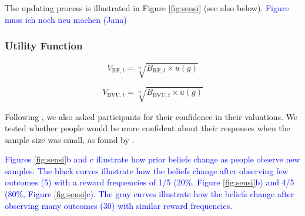 \documentclass[a4paper, man, natbib, floatsintext]{apa6} %
\begin{document}
The updating process is illustrated in Figure \ref{fig:sensi} (see also below). \textcolor{blue}{Figure muss ich noch neu machen (Jana)}

\subsubsection{Utility Function}

$$V_{\mathrm{RF}, t} = \sqrt[\mathrm{\alpha}]{{B}_{\mathrm{RF}, t} \times u({g})}$$

$$V_{\mathrm{BVU}, t} = \sqrt[\mathrm{\alpha}]{{B}_{\mathrm{BVU}, t} \times u({g})}$$


Following \cite{Griffin1992}, we also asked participants for their confidence in their valuations. We tested whether people would be more confident about their responses when the sample size was small, as found by \cite{Griffin1992}. 

\textcolor{blue}{Figures \ref{fig:sensi}b  and c illustrate how prior beliefs change as people observe new samples. The black curves illustrate how the beliefs change after observing few outcomes (5) with a reward frequencies of 1/5 (20\%, Figure \ref{fig:sensi}b)  and 4/5 (80\%, Figure \ref{fig:sensi}c). The gray curves illustrate how the beliefs change after observing many outcomes (30) with similar reward frequencies.}
\end{document}

